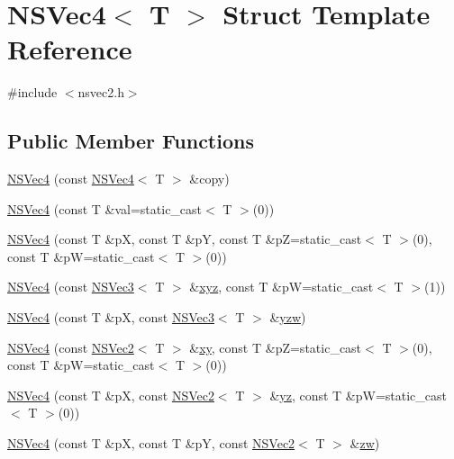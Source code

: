 \hypertarget{structNSVec4}{\section{N\-S\-Vec4$<$ T $>$ Struct Template Reference}
\label{structNSVec4}
}


{\ttfamily \#include $<$nsvec2.\-h$>$}

\subsection*{Public Member Functions}
\begin{DoxyCompactItemize}
\item 
\hyperlink{structNSVec4_a4a4b8dfa3a3d0f522d9a0010b0409ef5}{N\-S\-Vec4} (const \hyperlink{structNSVec4}{N\-S\-Vec4}$<$ T $>$ \&copy)
\item 
\hyperlink{structNSVec4_a9327e251102e79c09cb76bdb3d879bfc}{N\-S\-Vec4} (const T \&val=static\-\_\-cast$<$ T $>$(0))
\item 
\hyperlink{structNSVec4_a85dfa4b72980553fb2a268f267c9ec81}{N\-S\-Vec4} (const T \&p\-X, const T \&p\-Y, const T \&p\-Z=static\-\_\-cast$<$ T $>$(0), const T \&p\-W=static\-\_\-cast$<$ T $>$(0))
\item 
\hyperlink{structNSVec4_a285b94a2193ceb4c3898d0ef9544e59a}{N\-S\-Vec4} (const \hyperlink{structNSVec3}{N\-S\-Vec3}$<$ T $>$ \&\hyperlink{structNSVec4_a35b541a03b7f0f95a7f746a5bd6b7195}{xyz}, const T \&p\-W=static\-\_\-cast$<$ T $>$(1))
\item 
\hyperlink{structNSVec4_ae0dc79b31174dd75d1223baa9a135059}{N\-S\-Vec4} (const T \&p\-X, const \hyperlink{structNSVec3}{N\-S\-Vec3}$<$ T $>$ \&\hyperlink{structNSVec4_a06d459bf5ab6a486f902a39676f5c087}{yzw})
\item 
\hyperlink{structNSVec4_ad18741216271a656eaca76ebbcd24641}{N\-S\-Vec4} (const \hyperlink{structNSVec2}{N\-S\-Vec2}$<$ T $>$ \&\hyperlink{structNSVec4_ad46b30c4093a912f1f52811fa4d0397e}{xy}, const T \&p\-Z=static\-\_\-cast$<$ T $>$(0), const T \&p\-W=static\-\_\-cast$<$ T $>$(0))
\item 
\hyperlink{structNSVec4_a1af50bc12cc3f4dc60d3212519afef18}{N\-S\-Vec4} (const T \&p\-X, const \hyperlink{structNSVec2}{N\-S\-Vec2}$<$ T $>$ \&\hyperlink{structNSVec4_a6380a85ef86f586af599f6154777042e}{yz}, const T \&p\-W=static\-\_\-cast$<$ T $>$(0))
\item 
\hyperlink{structNSVec4_a38467899f894621ef3bb2c35ba872d1f}{N\-S\-Vec4} (const T \&p\-X, const T \&p\-Y, const \hyperlink{structNSVec2}{N\-S\-Vec2}$<$ T $>$ \&\hyperlink{structNSVec4_af5912d46333b72a29f6ff8e7429dd339}{zw})

\end{DoxyCompactItemize}
